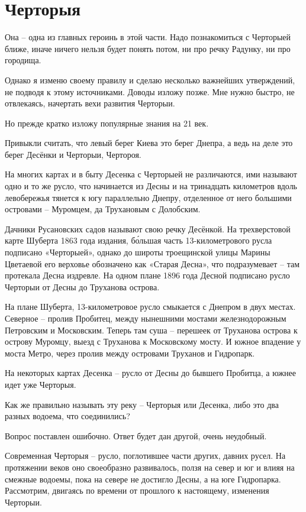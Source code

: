 \chapter{Черторыя}

Она – одна из главных героинь в этой части. Надо познакомиться с Черторыей ближе, иначе ничего нельзя будет понять потом, ни про речку Радунку, ни про городища.

Однако я изменю своему правилу и сделаю несколько важнейших утверждений, не подводя к этому источниками. Доводы изложу позже. Мне нужно быстро, не отвлекаясь, начертать вехи развития Черторыи.

Но прежде кратко изложу популярные знания на 21 век.

Привыкли считать, что левый берег Киева это берег Днепра, а ведь на деле это берег Десёнки и Черторыи, Чертороя. 

На многих картах и в быту Десенка с Черторыей не различаются, ими называют одно и то же русло, что начинается из Десны и на тринадцать километров вдоль левобережья тянется к югу параллельно Днепру, отделенное от него большими островами – Муромцем, да Трухановым с Долобским.

Дачники Русановских садов называют свою речку Десёнкой. На трехверстовой карте Шуберта 1863 года издания, б\'ольшая часть 13-километрового русла подписано «Черторыей», однако до широты троещинской улицы Марины Цветаевой его верховье обозначено как «Старая Десна», что подразумевает – там протекала Десна издревле. На одном плане 1896 года Десной подписано русло Черторыи от Десны до Труханова острова.

На плане Шуберта, 13-километровое русло смыкается с Днепром в двух местах. Северное – пролив Пробитец, между нынешними мостами железнодорожным Петровским и Московским. Теперь там суша – перешеек от Труханова острова к острову Муромцу, выезд с Труханова к Московскому мосту. И южное впадение у моста Метро, через пролив между островами Труханов и Гидропарк.

На некоторых картах Десенка – русло от Десны до бывшего Пробитца, а южнее идет уже Черторыя.

Как же правильно называть эту реку – Черторыя или Десенка, либо это два разных водоема, что соединились?

Вопрос поставлен ошибочно. Ответ будет дан другой, очень неудобный.

Современная Черторыя – русло, поглотившее части других, давних русел. На протяжении веков оно своеобразно развивалось, ползя на север и юг и влияя на смежные водоемы, пока на севере не достигло Десны, а на юге Гидропарка. Рассмотрим, двигаясь по времени от прошлого к настоящему, изменения Черторыи.

